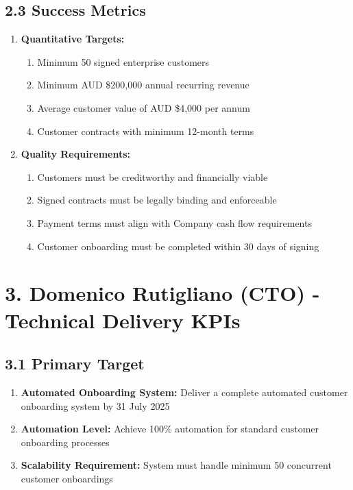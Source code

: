 \subsection*{2.3 Success Metrics}
\begin{enumerate}[label=\arabic*.]
\item \textbf{Quantitative Targets:}
    \begin{enumerate}[label=(\alph*)]
    \item Minimum 50 signed enterprise customers
    \item Minimum AUD \$200,000 annual recurring revenue
    \item Average customer value of AUD \$4,000 per annum
    \item Customer contracts with minimum 12-month terms
    \end{enumerate}

\item \textbf{Quality Requirements:}
    \begin{enumerate}[label=(\alph*)]
    \item Customers must be creditworthy and financially viable
    \item Signed contracts must be legally binding and enforceable
    \item Payment terms must align with Company cash flow requirements
    \item Customer onboarding must be completed within 30 days of signing
    \end{enumerate}
\end{enumerate}

\section*{3. Domenico Rutigliano (CTO) - Technical Delivery KPIs}

\subsection*{3.1 Primary Target}
\begin{enumerate}[label=\arabic*.]
\item \textbf{Automated Onboarding System:} Deliver a complete automated customer onboarding system by 31 July 2025
\item \textbf{Automation Level:} Achieve 100\% automation for standard customer onboarding processes
\item \textbf{Scalability Requirement:} System must handle minimum 50 concurrent customer onboardings
\end{enumerate}

